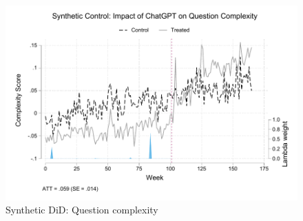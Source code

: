 \begin{figure}[H]
    \centering
    \includegraphics[width=1\linewidth]{imgs/stata/sdid_nlp_trends101.pdf}
    \caption{Synthetic DiD: Question complexity}
    \label{fig:cscore_synthetic_control}
\end{figure}

